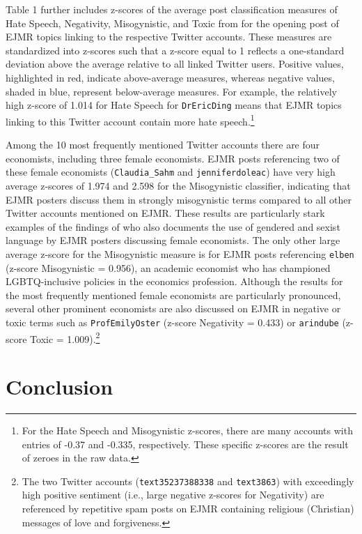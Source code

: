 \documentclass[PP]{AEA}
\begin{document}
Table 1 further includes z-scores of the average post classification measures of Hate Speech, Negativity, Misogynistic, and Toxic from \citet{ederer2024anonymity} for the opening post of EJMR topics linking to the respective Twitter accounts. These measures are standardized into z-scores such that a z-score equal to 1 reflects a one-standard deviation above the average relative to all linked Twitter users. Positive values, highlighted in red, indicate above-average measures, whereas negative values, shaded in blue, represent below-average measures. For example, the relatively high z-score of 1.014 for Hate Speech for \texttt{DrEricDing} means that EJMR topics linking to this Twitter account contain more hate speech.\footnote{For the Hate Speech and Misogynistic z-scores, there are many accounts with entries of -0.37 and -0.335, respectively. These specific z-scores are the result of zeroes in the raw data.}

Among the 10 most frequently mentioned Twitter accounts there are four economists, including three female economists. EJMR posts referencing two of these female economists (\texttt{Claudia\_Sahm} and \texttt{jenniferdoleac}) have very high average z-scores of 1.974 and 2.598 for the Misogynistic classifier, indicating that EJMR posters discuss them in strongly misogynistic terms compared to all other Twitter accounts mentioned on EJMR. These results are particularly stark examples of the findings of \cite{wu2018gendered,wu2020gender} who also documents the use of gendered and sexist language by EJMR posters discussing female economists. The only other large average z-score for the Misogynistic measure is for EJMR posts referencing \texttt{elben} (z-score Misogynistic = 0.956), an academic economist who has championed LGBTQ-inclusive policies in the economics profession. Although the results for the most frequently mentioned female economists are particularly pronounced, several other prominent economists are also discussed on EJMR in negative or toxic terms such as \texttt{ProfEmilyOster} (z-score Negativity = 0.433) or \texttt{arindube} (z-score Toxic = 1.009).\footnote{The two Twitter accounts (\texttt{text35237388338} and \texttt{text3863}) with exceedingly high positive sentiment (i.e., large negative z-scores for Negativity) are referenced by repetitive spam posts on EJMR containing religious (Christian) messages of love and forgiveness.}

\section{Conclusion}
\end{document}

